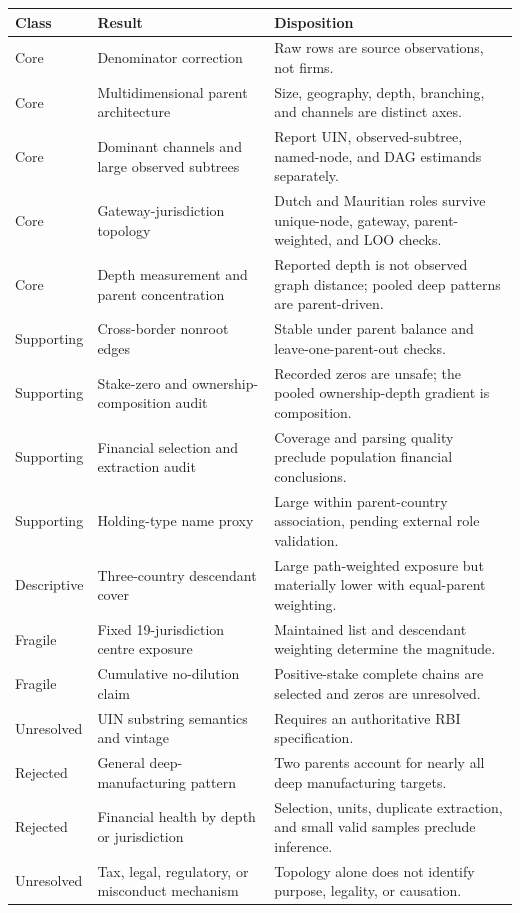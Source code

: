\begin{tabular}{l>{\raggedright\arraybackslash}p{}>{\raggedright\arraybackslash}p{}}
\toprule
Class & Result & Disposition \\
\midrule
Core & Denominator correction & Raw rows are source observations, not firms. \\
Core & Multidimensional parent architecture & Size, geography, depth, branching, and channels are distinct axes. \\
Core & Dominant channels and large observed subtrees & Report UIN, observed-subtree, named-node, and DAG estimands separately. \\
Core & Gateway-jurisdiction topology & Dutch and Mauritian roles survive unique-node, gateway, parent-weighted, and LOO checks. \\
Core & Depth measurement and parent concentration & Reported depth is not observed graph distance; pooled deep patterns are parent-driven. \\
Supporting & Cross-border nonroot edges & Stable under parent balance and leave-one-parent-out checks. \\
Supporting & Stake-zero and ownership-composition audit & Recorded zeros are unsafe; the pooled ownership-depth gradient is composition. \\
Supporting & Financial selection and extraction audit & Coverage and parsing quality preclude population financial conclusions. \\
Supporting & Holding-type name proxy & Large within parent-country association, pending external role validation. \\
Descriptive & Three-country descendant cover & Large path-weighted exposure but materially lower with equal-parent weighting. \\
Fragile & Fixed 19-jurisdiction centre exposure & Maintained list and descendant weighting determine the magnitude. \\
Fragile & Cumulative no-dilution claim & Positive-stake complete chains are selected and zeros are unresolved. \\
Unresolved & UIN substring semantics and vintage & Requires an authoritative RBI specification. \\
Rejected & General deep-manufacturing pattern & Two parents account for nearly all deep manufacturing targets. \\
Rejected & Financial health by depth or jurisdiction & Selection, units, duplicate extraction, and small valid samples preclude inference. \\
Unresolved & Tax, legal, regulatory, or misconduct mechanism & Topology alone does not identify purpose, legality, or causation. \\
\bottomrule
\end{tabular}
